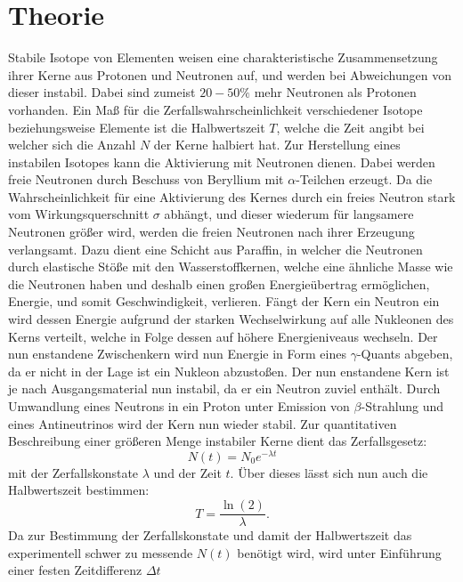 \section{Theorie}
\label{sec:Theorie}
Stabile Isotope von Elementen weisen eine charakteristische Zusammensetzung ihrer Kerne aus Protonen und Neutronen auf, und werden bei Abweichungen von dieser instabil.
Dabei sind zumeist $20-50 \si{\percent}$ mehr Neutronen als Protonen vorhanden. Ein Maß für die Zerfallswahrscheinlichkeit verschiedener Isotope beziehungsweise Elemente ist
die Halbwertszeit $T$, welche die Zeit angibt bei welcher sich die Anzahl $N$ der Kerne halbiert hat. Zur Herstellung eines instabilen Isotopes kann die Aktivierung mit Neutronen
dienen. Dabei werden freie Neutronen durch Beschuss von Beryllium mit $\alpha$-Teilchen erzeugt. Da die Wahrscheinlichkeit für eine Aktivierung des Kernes durch ein freies Neutron
stark vom Wirkungsquerschnitt $\sigma$ abhängt, und dieser wiederum für langsamere Neutronen größer wird, werden die freien Neutronen nach ihrer Erzeugung verlangsamt.
Dazu dient eine Schicht aus Paraffin, in welcher die Neutronen durch elastische Stöße mit den Wasserstoffkernen, welche eine ähnliche Masse wie die Neutronen haben und deshalb
einen großen Energieübertrag ermöglichen, Energie, und somit Geschwindigkeit, verlieren.
Fängt der Kern ein Neutron ein wird dessen Energie aufgrund der starken Wechselwirkung auf alle Nukleonen des Kerns verteilt, welche in Folge dessen auf höhere Energieniveaus wechseln.
Der nun enstandene Zwischenkern wird nun Energie in Form eines $\gamma$-Quants abgeben, da er nicht in der Lage ist ein Nukleon abzustoßen. Der nun enstandene Kern ist je nach
Ausgangsmaterial nun instabil, da er ein Neutron zuviel enthält. Durch Umwandlung eines Neutrons in ein Proton unter Emission von $\beta$-Strahlung und eines Antineutrinos wird der
Kern nun wieder stabil. Zur quantitativen Beschreibung einer größeren Menge instabiler Kerne dient das Zerfallsgesetz:
\begin{equation}
  N(t)= N_0 e^{- \lambda t}
  \label{eqn:Zerfallsgesetz}
\end{equation}
mit der Zerfallskonstate $\lambda$ und der Zeit $t$. Über dieses lässt sich nun auch die Halbwertszeit bestimmen:
\begin{equation}
  T=\frac{\ln(2)}{\lambda}.
  \label{eqn:Halbwertszeit}
\end{equation}
Da zur Bestimmung der Zerfallskonstate und damit der Halbwertszeit das experimentell schwer zu messende $N(t)$ benötigt wird, wird unter Einführung einer festen Zeitdifferenz $\Delta t$
